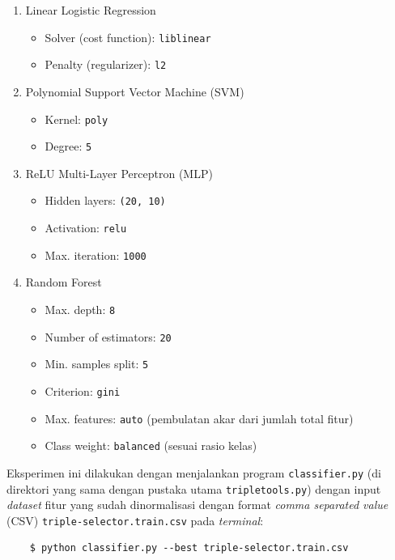 \begin{enumerate}

	\item Linear Logistic Regression
	\begin{itemize}
		\item Solver (cost function): \verb|liblinear|
		\item Penalty (regularizer): \verb|l2|
	\end{itemize}

	\item Polynomial Support Vector Machine (SVM)
	\begin{itemize}
		\item Kernel: \verb|poly|
		\item Degree: \verb|5|
	\end{itemize}

	\item ReLU Multi-Layer Perceptron (MLP)
	\begin{itemize}
		\item Hidden layers: \verb|(20, 10)|
		\item Activation: \verb|relu| \citep{nair2010rectified}
		\item Max. iteration: \verb|1000|
	\end{itemize}
	
	\item Random Forest
	\begin{itemize}
		\item Max. depth: \verb|8|
		\item Number of estimators: \verb|20|
		\item Min. samples split: \verb|5|
		\item Criterion: \verb|gini| \citep{mingers1989empirical}
		\item Max. features: \verb|auto| (pembulatan akar dari jumlah total fitur)
		\item Class weight: \verb|balanced| (sesuai rasio kelas)
	\end{itemize}

\end{enumerate}

Eksperimen ini dilakukan dengan menjalankan program \verb|classifier.py| (di direktori yang sama dengan pustaka utama \verb|tripletools.py|) dengan input \textit{dataset} fitur yang sudah dinormalisasi dengan format \textit{comma separated value} (CSV) \verb|triple-selector.train.csv| pada \textit{terminal}:

\begin{verbatim}
	$ python classifier.py --best triple-selector.train.csv
\end{verbatim}

